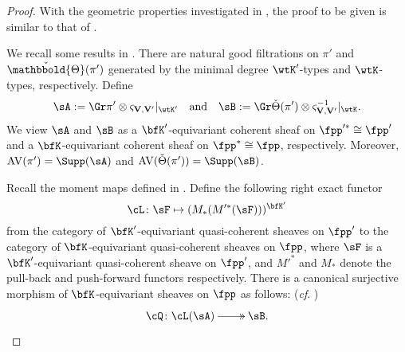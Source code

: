 \documentclass[12pt,a4paper]{amsart}
\newcommand{\AV}{\mathrm{AV}}
\newcommand{\CO}{{\mathcal {O}}}
\newcommand{\CX}{{\mathcal {X}}}
\numberwithin{equation}{section}
\theoremstyle{remark}
\def\slift{\cL}
\def\bbThetav{\check{\mathbbold{\Theta}}}
\def\Thetav{\check{\Theta}}
\def\Thetav{\check{\Theta}}
\def\mktvvp{\varsigma_{{\bf V},{\bf V}'}}
\begin{document}
\section{}

\begin{proof}%
With the geometric properties investigated in , the proof to be given is
similar to that of \cite[Theorem~C]{LM}.


We recall some results in \cite{LM}. There are natural
good filtrations on $\pi'$ and $\bbThetav(\pi')$ generated by the minimal degree
$\wtK'$-types and $\wtK$-types, respectively. Define
\[
  \sA := \Gr \pi' \otimes \mktvvp|_{\wtK'}
  \quad \text{and} \quad
  \sB := \Gr \Thetav(\pi') \otimes \mktvvp^{-1}|_{\wtK}.
\]
We view $\sA$ and $\sB$  as a $\bfK'$-equivariant coherent sheaf on
$\fpp'^*\cong \fpp'$ and a $\bfK$-equivariant coherent sheaf on
$\fpp^* \cong \fpp$, respectively. Moreover, $\AV(\pi') = \Supp(\sA)$ and $\AV(\Thetav(\pi')) = \Supp(\sB)$.

Recall the moment maps defined in .
Define the following right exact functor
\[
\slift\colon \sF \mapsto (M_*(M'^*(\sF)))^{\bfK'}
\]
from the category of $\bfK'$-equivariant quasi-coherent sheaves on $\fpp'$ to
the category of $\bfK$-equivariant quasi-coherent sheaves on $\fpp$, where
$\sF$ is a $\bfK'$-equivariant quasi-coherent sheave on $\fpp'$, and
$M'^*$ and $M_*$ denote the pull-back and push-forward functors respectively. %
There is a canonical surjective morphism of
$\bfK$-equivariant sheaves on $\fpp$ as follows:
(\emph{cf}. \cite[Equation~(16)]{LM})
\[%
\xymatrix{
\cQ \colon \slift(\sA) \ar@{->>}[r]& \sB.
}
\]%


\end{proof}
\end{document}
